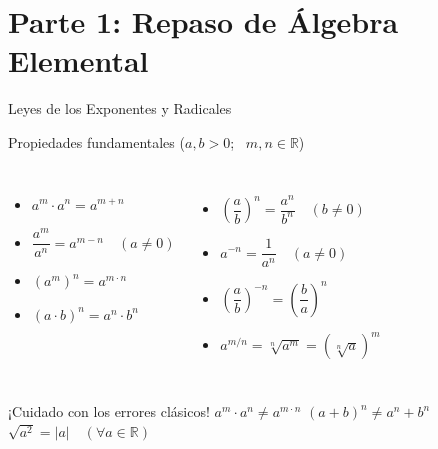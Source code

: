 \documentclass[aspectratio=169]{beamer}
\begin{document}
\begin{frame}[plain]
  \titlepage
\end{frame}

\section{Parte 1: Repaso de Álgebra Elemental}


\begin{frame}{Leyes de los Exponentes y Radicales}
  \begin{block}{Propiedades fundamentales ($a, b > 0$; \ $m, n \in \mathbb{R}$)}
    \begin{columns}[T]
      \begin{itemize}
        \item $a^m \cdot a^n = a^{m+n}$
        \item $\dfrac{a^m}{a^n} = a^{m-n} \quad (a \neq 0)$
        \item $(a^m)^n = a^{m \cdot n}$
        \item $(a \cdot b)^n = a^n \cdot b^n$
      \end{itemize}
      \begin{itemize}
        \item $\left(\dfrac{a}{b}\right)^n = \dfrac{a^n}{b^n} \quad (b \neq 0)$
        \item $a^{-n} = \dfrac{1}{a^n} \quad (a \neq 0)$
        \item $\left(\dfrac{a}{b}\right)^{-n} = \left(\dfrac{b}{a}\right)^n$
        \item $a^{m/n} = \sqrt[n]{a^m} = (\sqrt[n]{a})^m$
      \end{itemize}
    \end{columns}
  \end{block}

  \vspace{4pt}
  \begin{alertblock}{¡Cuidado con los errores clásicos!}
    $a^m \cdot a^n \neq a^{m \cdot n}$ \qquad $(a + b)^n \neq a^n + b^n$ \qquad $\sqrt{a^2} = |a| \quad (\forall a \in \mathbb{R})$
  \end{alertblock}
\end{frame}
\end{document}
